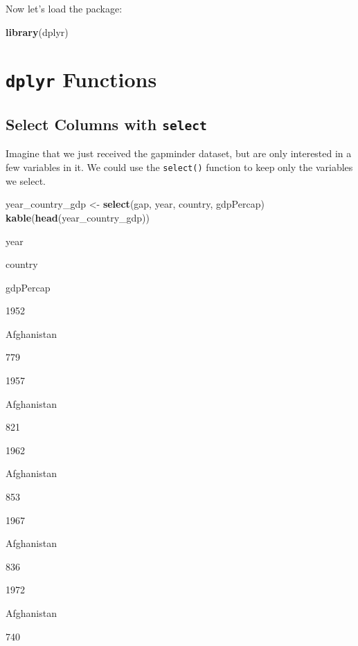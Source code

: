 \documentclass[]{book}
\newenvironment{Shaded}{\begin{snugshade}}{\end{snugshade}}
\newcommand{\KeywordTok}[1]{\textcolor[rgb]{0.13,0.29,0.53}{\textbf{#1}}}
\newcommand{\NormalTok}[1]{#1}
\newcommand{\StringTok}[1]{\textcolor[rgb]{0.31,0.60,0.02}{#1}}
\begin{document}
Now let's load the package:

\begin{Shaded}
\begin{Highlighting}[]
\KeywordTok{library}\NormalTok{(dplyr)}
\end{Highlighting}
\end{Shaded}

\hypertarget{dplyr-functions}{%
\section{\texorpdfstring{\texttt{dplyr} Functions}{dplyr Functions}}\label{dplyr-functions}}

\hypertarget{select-columns-with-select}{%
\subsection{\texorpdfstring{Select Columns with \texttt{select}}{Select Columns with select}}\label{select-columns-with-select}}

Imagine that we just received the gapminder dataset, but are only interested in a few variables in it. We could use the \texttt{select()} function to keep only the variables we select.

\begin{Shaded}
\begin{Highlighting}[]
\NormalTok{year_country_gdp <-}\StringTok{ }\KeywordTok{select}\NormalTok{(gap, year, country, gdpPercap)}
\KeywordTok{kable}\NormalTok{(}\KeywordTok{head}\NormalTok{(year_country_gdp))}
\end{Highlighting}
\end{Shaded}

year

country

gdpPercap

1952

Afghanistan

779

1957

Afghanistan

821

1962

Afghanistan

853

1967

Afghanistan

836

1972

Afghanistan

740
\end{document}
